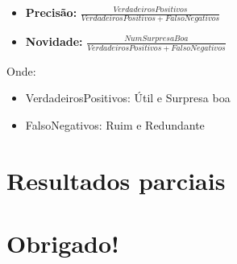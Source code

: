 \begin{frame}

\begin{itemize}
    \item \textbf{Precisão: } $\frac{VerdadeirosPositivos}{VerdadeirosPositivos
        + FalsoNegativos}$
    \item \textbf{Novidade: } $\frac{NumSurpresaBoa}{VerdadeirosPositivos +
        FalsoNegativos}$
\end{itemize}

Onde:

    \begin{itemize}
        \item VerdadeirosPositivos: Útil e Surpresa boa
        \item FalsoNegativos: Ruim e Redundante
    \end{itemize}

\end{frame}

\section{Resultados parciais} %
\label{sec:resultados_parciais}

\section{Obrigado!}
\label{sec:obrigado}



